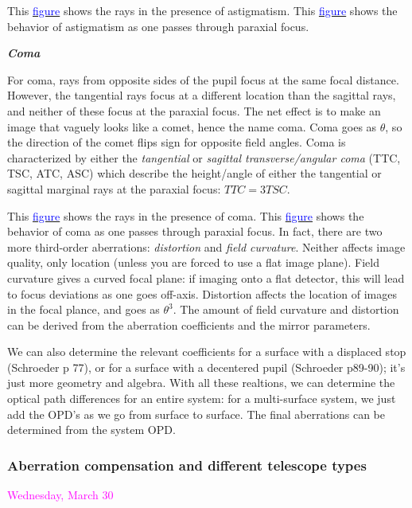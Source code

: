 \documentclass[12pt]{article}
\begin{document}
This \href{http://astronomy.nmsu.edu/holtz/a535/html/diagrams/a535/astig.htm}
{\textcolor{blue}{figure}} shows the rays in the presence of astigmatism.
This \href{http://astronomy.nmsu.edu/holtz/a535/html/diagrams/a535/z5.htm}
{\textcolor{blue}{figure}}
shows the behavior of astigmatism as one passes through paraxial focus.

\textbf{\emph{Coma}}

For coma, rays from opposite sides of the pupil focus at the same
focal distance. However, the tangential rays focus at a different
location than the sagittal rays, and neither of these focus at the
paraxial focus. The net effect is to make an image that vaguely looks
like a comet, hence the name coma. Coma goes as $\theta$, so the
direction of the comet flips sign for opposite field angles. Coma is
characterized by either the \emph{tangential} or \emph{sagittal
transverse/angular coma} (TTC, TSC, ATC, ASC) which describe the
height/angle of either the tangential or sagittal marginal rays at the
paraxial focus: $TTC = 3TSC$.

This \href{http://astronomy.nmsu.edu/holtz/a535/html/diagrams/a535/coma.htm}
{\textcolor{blue}{figure}} shows the rays in the presence of coma.
This \href{http://astronomy.nmsu.edu/holtz/a535/html/diagrams/a535/z7.htm}
{\textcolor{blue}{figure}} shows the behavior of coma as one passes
through paraxial focus.
In fact, there are two more third-order aberrations:
\emph{distortion} and \emph{field curvature}.
Neither affects image quality, only location (unless
you are forced to use a flat image plane). Field curvature gives a
curved focal plane: if imaging onto a flat detector, this will lead to
focus deviations as one goes off-axis. Distortion affects the location
of images in the focal plance, and goes as $\theta^{3}$.
The amount of field curvature and distortion can be derived from the
aberration coefficients and the mirror parameters.

We can also determine the relevant coefficients for a surface with a
displaced stop (Schroeder p 77), or for a surface with a decentered
pupil (Schroeder p89-90); it's just more geometry and algebra. With
all these realtions, we can determine the optical path differences for
an entire system: for a multi-surface system, we just add the OPD's as
we go from surface to surface. The final aberrations can be determined
from the system OPD.

\subsubsection*{Aberration compensation and different telescope types}
\textcolor{magenta}{Wednesday, March 30}
\end{document}
